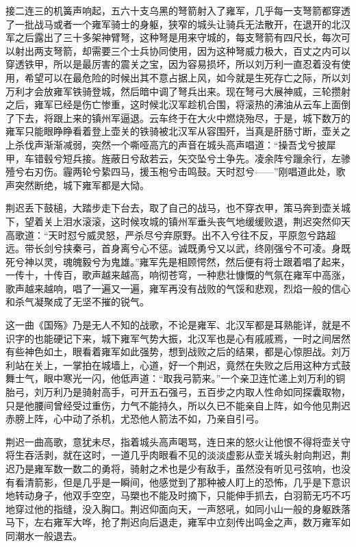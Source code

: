 接二连三的机簧声响起，五六十支乌黑的弩箭射入了雍军，几乎每一支弩箭都穿透了一批战马或者一个雍军骑士的身躯，狭窄的城头让骑兵无法散开，在退开的北汉军之后露出了三十多架神臂弩，这种弩是用来守城的，每支弩箭有四尺长，每次可以射出两支弩箭，却需要三个士兵协同使用，因为这种弩威力极大，百丈之内可以穿透铁甲，所以是最厉害的震关之宝，因为容易损坏，所以刘万利一直忍着没有使用，希望可以在最危险的时候出其不意占据上风，如今就是生死存亡之际，所以刘万利才会放雍军铁骑登城，然后暗中调了弩兵出来。现在弩弓大展神威，三轮攒射之后，雍军已经是伤亡惨重，这时候北汉军趁机合围，将滚热的沸油从云车上面倒了下去，将跟上来的镇州军逼退。云车终于在大火中燃烧殆尽，于是，城下数万的雍军只能眼睁睁看着登上壶关的铁骑被北汉军从容围歼，当真是肝肠寸断，壶关之上杀伐声渐渐减弱，突然一个嘶哑高亢的声音在城头高声唱道：“操吾戈兮披犀甲，车错毂兮短兵接。旌蔽日兮敌若云，矢交坠兮土争先。凌余阵兮躐余行，左骖殪兮右刃伤。霾两轮兮絷四马，援玉枹兮击鸣鼓。天时怼兮——”刚唱道此处，歌声突然断绝，城下雍军都是大恸。

荆迟丢下鼓槌，大踏步走下台去，取了自己的战马，也不穿衣甲，策马奔到壶关城下，望着关上泪水滚滚，这时候攻城的镇州军垂头丧气地缓缓败退，荆迟突然仰天高歌道：“天时怼兮威灵怒，严杀尽兮弃原野。出不入兮往不反，平原忽兮路超远。带长剑兮挟秦弓，首身离兮心不惩。诚既勇兮又以武，终刚强兮不可凌。身既死兮神以灵，魂魄毅兮为鬼雄。”雍军先是相顾愕然，然后便有将士跟着唱了起来，一传十，十传百，歌声越来越高，响彻苍穹，一种悲壮慷慨的气氛在雍军中高涨，歌声越来越响，唱了一遍又一遍，雍军再没有战败的气馁和悲观，烈焰一般的信心和杀气凝聚成了无坚不摧的锐气。

这一曲《国殇》乃是无人不知的战歌，不论是雍军、北汉军都是耳熟能详，就是不识字的也能硬记下来，城下雍军气势大振，北汉军也是心有戚戚焉，一时之间居然有些神色如土，眼看着雍军如此强势，想到战败之后的结果，都是心惊胆战。刘万利站在关上，一掌拍在城墙上，心道，好一个荆迟，竟然在失败之后用这种方式鼓舞士气，眼中寒光一闪，他低声道：“取我弓箭来。”一个亲卫连忙递上刘万利的铜胎弓，刘万利乃是骑射高手，可开五石强弓，五百步之内取人性命如同探囊取物，只是他腰间曾经受过重伤，力气不能持久，所以久已不能亲自上阵，如今他见荆迟赤膀上阵，心中动了杀机，尤恐他人箭法不如，乃亲自引弓。

荆迟一曲高歌，意犹未尽，指着城头高声喝骂，连日来的怒火让他恨不得将壶关守将生吞活剥，就在这时，一道几乎肉眼看不见的淡淡虚影从壶关城头射向荆迟，荆迟乃是雍军数一数二的勇将，骑射之术也是少有敌手，虽然没有听见弓弦响，也没有看清箭影，但是几乎是一瞬间，他感觉到了那种被人盯上的恐怖，几乎是下意识地转动身子，他双手空空，马槊也不能及时摘下，只能伸手抓去，白羽箭无巧不巧地穿过他的指缝，没入胸口。荆迟仰面向天，一声怒吼，如同小山一般的身躯跌落马下，左右雍军大哗，抢了荆迟向后退走，雍军中立刻传出鸣金之声，数万雍军如同潮水一般退去。

